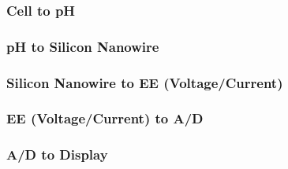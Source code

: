 \documentclass[11pt,journal,compsoc, onecolumn]{IEEEtran}
\begin{document}
\subsubsection{Cell to pH}

\subsubsection{pH to Silicon Nanowire}

\subsubsection{Silicon Nanowire to EE (Voltage/Current)}

\subsubsection{EE (Voltage/Current) to A/D}

\subsubsection{A/D to Display}

%
%

\end{document}
